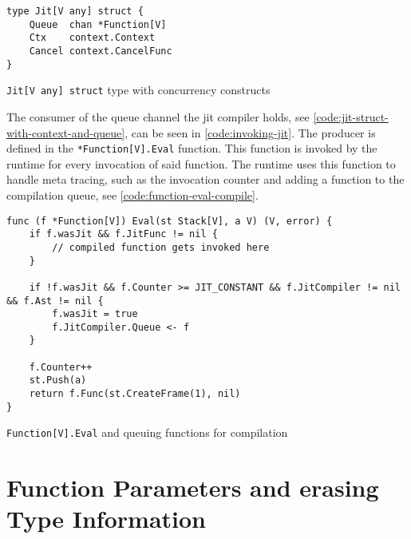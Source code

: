 \begin{listing}[H]
    \begin{verbatim}
type Jit[V any] struct {
	Queue  chan *Function[V]
	Ctx    context.Context
	Cancel context.CancelFunc
}
    \end{verbatim}
    \caption{\texttt{Jit[V any] struct} type with concurrency constructs}
    \label{code:jit-struct-with-context-and-queue}
\end{listing}

The consumer of the queue channel the jit compiler holds, see
\autoref{code:jit-struct-with-context-and-queue}, can be seen in
\autoref{code:invoking-jit}. The producer is defined in the
\texttt{*Function[V].Eval} function. This function is invoked by the runtime
for every invocation of said function. The runtime uses this function to handle
meta tracing, such as the invocation counter and adding a function to the
compilation queue, see \autoref{code:function-eval-compile}.

\begin{listing}[H]
    \begin{verbatim}
func (f *Function[V]) Eval(st Stack[V], a V) (V, error) {
    if f.wasJit && f.JitFunc != nil {
        // compiled function gets invoked here
    }

    if !f.wasJit && f.Counter >= JIT_CONSTANT && f.JitCompiler != nil && f.Ast != nil {
        f.wasJit = true
        f.JitCompiler.Queue <- f
    }

    f.Counter++
    st.Push(a)
    return f.Func(st.CreateFrame(1), nil)
}

    \end{verbatim}
    \caption{\texttt{Function[V].Eval} and queuing functions for compilation}
    \label{code:function-eval-compile}
\end{listing}

\section{Function Parameters and erasing Type Information}

